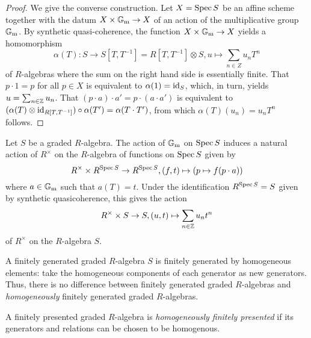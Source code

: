 \begin{proof}
  We give the converse construction.  Let $X = \operatorname{Spec} S$ be an affine
  scheme together with the datum $X \times \mathbb{G}_\mathrm{m} \to X$ of an action of
  the multiplicative group $\mathbb{G}_\mathrm{m}$.  By synthetic quasi-coherence, the
  function $X \times \mathbb{G}_\mathrm{m} \to X$ yields a homomorphism
  \begin{equation*}
    \alpha(T)\colon S \to S[T, T^{-1}] = R[T, T^{-1}] \otimes S, u \mapsto \sum_{n \in Z} u_n T^n
  \end{equation*}
  of $R$-algebras where the sum on the right hand side is essentially
  finite.  That $p \cdot 1 = p$ for all $p \in X$ is equivalent to
  $\alpha(1) = \mathrm{id}_S$, which, in turn, yields
  $u = \sum_{n \in \mathbb{Z}} u_n$.  That $(p \cdot a) \cdot a' = p \cdot (a \cdot a')$ is equivalent to
  $(\alpha(T) \otimes \mathrm{id}_{R[T, T^{-1}]}) \circ \alpha(T') = \alpha(T \cdot T')$, from which $\alpha(T) (u_n) = u_n T^n$ follows.
\end{proof}

\begin{remark}
  Let $S$ be a graded $R$-algebra.  The action of $\mathbb{G}_\mathrm{m}$ on $\operatorname{Spec} S$ induces a natural action of $R^\times$ on the $R$-algebra of functions
  on $\operatorname{Spec} S$ given by
  \begin{equation*}
    R^\times \times R^{\operatorname{Spec} S} \to R^{\operatorname{Spec} S}, (f, t) \mapsto (p \mapsto f(p \cdot a))
  \end{equation*}
  where $a \in \mathbb{G}_\mathrm{m}$ such that $a(T) = t$.
  Under the identification $R^{\operatorname{Spec} S} = S$ given by synthetic quasicoherence, this gives the action
  \begin{equation*}
    R^\times \times S \to S, (u, t) \mapsto \sum_{n \in \mathbb{Z}} u_n t^n
  \end{equation*}
  of $R^\times$ on the $R$-algebra $S$.
\end{remark}

\begin{remark}
  A finitely generated graded $R$-algebra $S$ is finitely generated by
  homogeneous elements: take the homogeneous components of each
  generator as new generators.  Thus, there is no difference between
  finitely generated graded $R$-algebras and \emph{homogeneously}
  finitely generated graded $R$-algebras.
\end{remark}

\begin{definition}
  A finitely presented graded $R$-algebra is \emph{homogeneously
    finitely presented} if its generators and relations can be chosen
  to be homogenous.
\end{definition}

